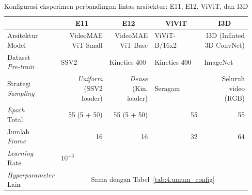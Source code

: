 \begin{table}[H]
\centering
\caption{Konfigurasi eksperimen perbandingan lintas arsitektur: E11, E12, ViViT, dan I3D}
\label{tab:4.s6_config}
{\setlength{\tabcolsep}{3pt}
\footnotesize
\begin{tabular}{|l|r|r|r|r|}
\hline
\rowcolor{gray!15} \multicolumn{1}{|l|}{\textbf{Parameter}} & \multicolumn{1}{c|}{\cellcolor{gray!15}\textbf{E11}} & \multicolumn{1}{c|}{\cellcolor{gray!15}\textbf{E12}} & \multicolumn{1}{c|}{\cellcolor{gray!15}\textbf{ViViT}} & \multicolumn{1}{c|}{\cellcolor{gray!15}\textbf{I3D}} \\
\hline
\makecell[l]{Arsitektur\\Model} & \makecell[l]{VideoMAE\\ViT-Small} & \makecell[l]{VideoMAE\\ViT-Base} & \multicolumn{1}{l|}{ViViT-B/16x2} & \makecell[l]{I3D (Inflated\\3D ConvNet)} \\
\hline
\makecell[l]{Dataset\\\textit{Pre-train}} & \multicolumn{1}{l|}{SSV2} & \multicolumn{1}{l|}{Kinetics-400} & \multicolumn{1}{l|}{Kinetics-400} & \multicolumn{1}{l|}{ImageNet} \\
\hline
\makecell[l]{Strategi\\\textit{Sampling}} & \makecell[l]{\textit{Uniform}\\(SSV2 loader)} & \makecell[l]{\textit{Dense}\\(Kin. loader)} & \multicolumn{1}{l|}{Seragam} & \makecell[l]{Seluruh video\\(RGB)} \\
\hline
\makecell[l]{\textit{Epoch}\\Total} & \multicolumn{1}{r|}{55 (5 + 50)} & \multicolumn{1}{r|}{55 (5 + 50)} & \multicolumn{1}{r|}{55} & \multicolumn{1}{r|}{55} \\
\hline
\makecell[l]{Jumlah\\\textit{Frame}} & \multicolumn{1}{r|}{16} & \multicolumn{1}{r|}{16} & \multicolumn{1}{r|}{32} & \multicolumn{1}{r|}{64} \\
\hline
\makecell[l]{\textit{Learning}\\Rate} & \multicolumn{4}{l|}{$10^{-3}$} \\
\hline
\makecell[l]{\textit{Hyperparameter}\\Lain} & \multicolumn{4}{c|}{Sama dengan Tabel~\ref{tab:4.umum_config}} \\
\hline
\end{tabular}
}
\end{table}

